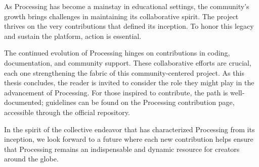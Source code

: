 As Processing has become a mainstay in educational settings, the community's growth brings challenges in maintaining its collaborative spirit. The project thrives on the very contributions that defined its inception. To honor this legacy and sustain the platform, action is essential.

The continued evolution of Processing hinges on contributions in coding, documentation, and community support. These collaborative efforts are crucial, each one strengthening the fabric of this community-centered project. As this thesis concludes, the reader is invited to consider the role they might play in the advancement of Processing. For those inspired to contribute, the path is well-documented; guidelines can be found on the Processing contribution page, accessible through the official repository.

In the spirit of the collective endeavor that has characterized Processing from its inception, we look forward to a future where each new contribution helps ensure that Processing remains an indispensable and dynamic resource for creators around the globe.
